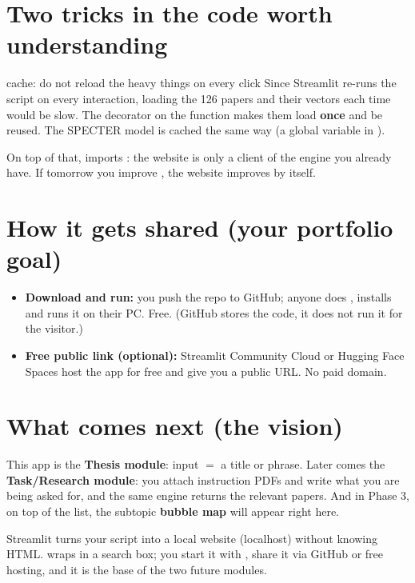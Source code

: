\documentclass[11pt,a4paper]{article}
\begin{document}
\section{Two tricks in the code worth understanding}

\begin{concepto}{cache: do not reload the heavy things on every click}
Since Streamlit re-runs the script on every interaction, loading the 126 papers and their
vectors each time would be slow. The  decorator on the
 function makes them load \textbf{once} and be reused. The SPECTER model
is cached the same way (a global variable in ).
\end{concepto}

On top of that,  imports : the website
is only a client of the engine you already have. If tomorrow you improve
, the website improves by itself.

\section{How it gets shared (your portfolio goal)}

\begin{itemize}
  \item \textbf{Download and run:} you push the repo to GitHub; anyone does ,
        installs  and runs it on their PC. Free. (GitHub stores the
        code, it does not run it for the visitor.)
  \item \textbf{Free public link (optional):} Streamlit Community Cloud or Hugging Face Spaces
        host the app for free and give you a public URL. No paid domain.
\end{itemize}

\section{What comes next (the vision)}

This app is the \textbf{Thesis module}: input $=$ a title or phrase. Later comes the
\textbf{Task/Research module}: you attach instruction PDFs and write what you are being asked
for, and the same engine returns the relevant papers. And in Phase 3, on top of the list, the
subtopic \textbf{bubble map} will appear right here.

\begin{resumen}
Streamlit turns your script into a local website (localhost) without knowing HTML.
 wraps  in a search box; you start it with
, share it via GitHub or free hosting, and it is the base of the
two future modules.
\end{resumen}
\end{document}
